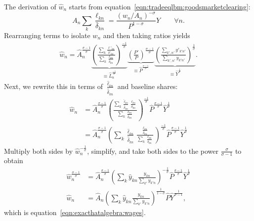 \documentclass[11pt]{article}
\theoremstyle{definition}
\begin{document}
The derivation of $\hat{w}_n$ starts from equation~\eqref{eqn:tradeeqlbm:goodsmarketclearing}:
\begin{equation*}
	A_n \sum_k \frac{\ell_{kn}}{\bar{\delta}_{kn}} 
=
\frac{\left({w_n}/{A_n}\right)^{-\sigma}}{P^{1-\sigma}} Y \qquad \forall n
.
\end{equation*}
Rearranging terms to isolate $w_n$ and then taking ratios yields
\begin{align} \label{eqn:hat_wage}
\hat{w}_n
=
\hat{A}_{n}^{\frac{\sigma-1}{\sigma}} 
\underbrace{\left(\frac{\sum_k \frac{\ell'_{kn}}{\bar{\delta}'_{kn}}}{\sum_k \frac{\ell_{kn}}{\bar{\delta}_{kn}}} \right)^\frac{-1}{\sigma} }_{\equiv \hat{L}_{n}^\frac{-1}{\sigma}}
\underbrace{\left(\frac{P'}{P}\right)^{\frac{\sigma-1}{\sigma}} }_{\equiv \hat{P}^{\frac{\sigma-1}{\sigma}}} 
\underbrace{\left(\frac{\sum_{k',n'} y'_{k'n'}}{\sum_{k',n'} y_{k'n'}} \right)^\frac{1}{\sigma}}_{\equiv \hat{Y}^{\frac{1}{\sigma}}}. 
\end{align}
Next, we rewrite this in terms of $\frac{\hat{\ell}_{kn}}{\hat{\bar{\delta}}_{kn}}$ and baseline shares:
\begin{align*}
	\hat{w}_{n}
&= \hat{A}_{n}^{\frac{\sigma-1}{\sigma}}
\left(\frac{\sum_k \frac{\hat{\ell}_{kn}}{\hat{\bar{\delta}}_{kn}} \frac{\ell_{kn}}{\bar{\delta}_{kn}}}{\sum_k \frac{\ell_{kn}}{\bar{\delta}_{kn}}} \right)^\frac{-1}{\sigma}
\hat{P}^{\frac{\sigma-1}{\sigma}}
\hat{Y}^{\frac{1}{\sigma}} \\
&= \hat{A}_{n}^{\frac{\sigma-1}{\sigma}}
\left(\sum_k \frac{\hat{\ell}_{kn}}{\hat{\bar{\delta}}_{kn}} \frac{\frac{\ell_{kn}}{\bar{\delta}_{kn}}}{\sum_k \frac{\ell_{kn}}{\bar{\delta}_{kn}}} \right)^\frac{-1}{\sigma}
\hat{P}^{\frac{\sigma-1}{\sigma}}
\hat{Y}^{\frac{1}{\sigma}} 
\end{align*}
Multiply both sides by $\hat{w}_{n}^{-\frac{1}{\sigma}}$, simplify, and take both sides to the power $\frac{\sigma}{\sigma-1}$ to obtain
\begin{align*} \label{eqn:hat_wage_expression} 
\hat{w}_{n}^{\frac{\sigma-1}{\sigma}}
&= \hat{A}_{n}^{\frac{\sigma-1}{\sigma}}\left(\sum_{k}\hat{y}_{kn}\frac{y_{kn}}{\sum_{k'}y_{k'n}}\right)^{-\frac{1}{\sigma}}
\hat{P}^{\frac{\sigma-1}{\sigma}} 
\hat{Y}^{\frac{1}{\sigma}} \nonumber \\
\hat{w}_{n} &= \hat{A}_{n}\left(\sum_{k}\hat{y}_{kn}\frac{y_{kn}}{\sum_{k'}y_{k'n}}\right)^{\frac{1}{1-\sigma}} 
\hat{P}
\hat{Y}^{\frac{1}{\sigma-1}}
,\end{align*}
which is equation~\eqref{eqn:exacthatalgebra:wages}.
\end{document}
